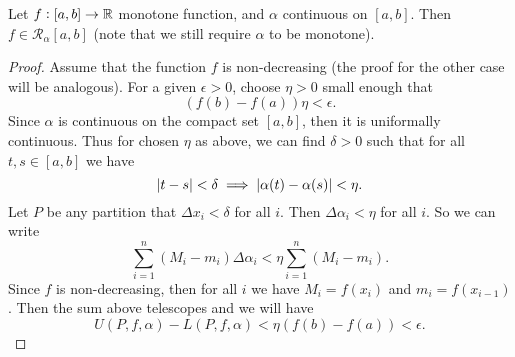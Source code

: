 \begin{theorem}
	Let $f:[a,b] \to \mathbb{R}$ monotone function, and $\alpha$ continuous on $[a,b]$. Then $f \in \mathcal{R}_\alpha[a,b]$ (note that we still require $\alpha$ to be monotone). 
\end{theorem}
\begin{proof}
	Assume that the function $f$ is non-decreasing (the proof for the other case will be analogous). For a given $\epsilon>0$, choose $\eta>0$ small enough that
	\[ (f(b) - f(a))\eta < \epsilon. \]
	Since $\alpha$ is continuous on the compact set $[a,b]$, then it is uniformally continuous. Thus for chosen $\eta$ as above, we can find $\delta>0$ such that for all $t,s \in [a,b]$ we have
	\[ |t-s| < \delta \implies |\alpha(t) - \alpha(s)| < \eta. \]
	Let $P$ be any partition that $\Delta x_i < \delta$ for all $i$. Then $\Delta \alpha_i < \eta$ for all $i$. So we can write
	\[ \sum_{i=1}^{n} (M_i - m_i)\Delta\alpha_i < \eta \sum_{i=1}^{n} (M_i - m_i). \]
	Since $f$ is non-decreasing, then for all $i$ we have $M_i = f(x_i)$ and $m_i = f(x_{i-1})$. Then the sum above telescopes and we will have
	\[ U(P,f,\alpha) - L(P,f,\alpha) < \eta (f(b) - f(a)) < \epsilon. \]
\end{proof}
